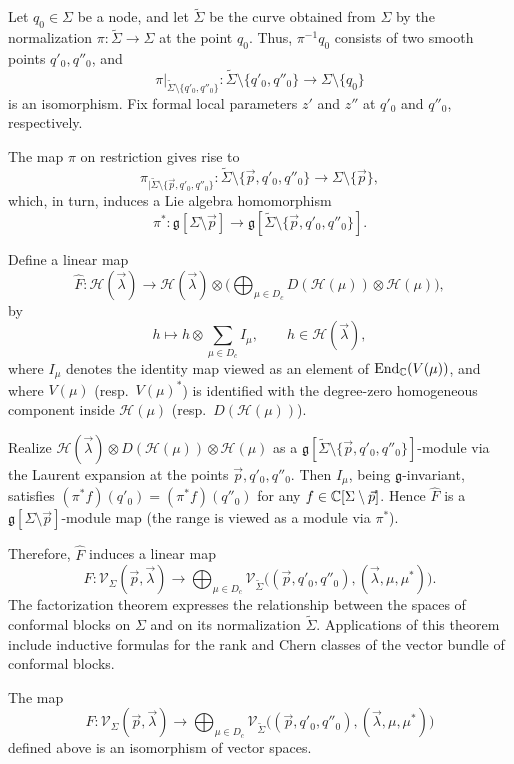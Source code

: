 \documentclass[12pt]{article}
\begin{document}
Let $q_0\in\Sigma$ be a node, and let $\widetilde\Sigma$ be the curve obtained from $\Sigma$ by the normalization $\pi:\widetilde\Sigma\to\Sigma$ at the point $q_0$. Thus, $\pi^{-1}q_0$ consists of two smooth points $q'_0,q''_0$, and
\[
  \pi|_{\widetilde\Sigma\setminus\{q'_0,q''_0\}}:\widetilde\Sigma\setminus\{q'_0,q''_0\}\longrightarrow\Sigma\setminus\{q_0\}
\]
is an isomorphism. Fix formal local parameters $z'$ and $z''$ at $q'_0$ and $q''_0$, respectively.

The map $\pi$ on restriction gives rise to
\[
  \pi_{|\widetilde\Sigma\setminus\{\vec p,q'_0,q''_0\}}:\widetilde\Sigma\setminus\{\vec p,q'_0,q''_0\}\longrightarrow\Sigma\setminus\{\vec p\},
\]
which, in turn, induces a Lie algebra homomorphism
\[
  \pi^*:\mathfrak g[\Sigma\setminus\vec p]\longrightarrow\mathfrak g[\widetilde\Sigma\setminus\{\vec p,q'_0,q''_0\}].
\]

Define a linear map
\[
  \widehat F: \mathcal H(\vec\lambda) \longrightarrow \mathcal H(\vec\lambda) \otimes \biggl( \bigoplus_{\mu\in D_c} D(\mathcal H(\mu)) \otimes \mathcal H(\mu) \biggr),
\]
by
\[
  h \longmapsto h \otimes \sum_{\mu\in D_c} I_\mu, \qquad h\in\mathcal H(\vec\lambda),
\]
where $I_\mu$ denotes the identity map viewed as an element of $\operatorname{End}_{\mathbb{C}}(V(\mu))$, and where $V(\mu)$ (resp.~$V(\mu)^*$) is identified with the degree-zero homogeneous component inside $\mathcal H(\mu)$ (resp.~$D(\mathcal H(\mu))$).

Realize $\mathcal H(\vec\lambda)\otimes D(\mathcal H(\mu))\otimes\mathcal H(\mu)$ as a $\mathfrak g[\widetilde\Sigma\setminus\{\vec p,q'_0,q''_0\}]$-module via the Laurent expansion at the points $\vec p, q'_0, q''_0$. Then $I_\mu$, being $\mathfrak g$-invariant, satisfies $(\pi^*f)(q'_0)=(\pi^*f)(q''_0)$ for any $f\in\mathbb{C}[\Sigma\setminus\vec p]$. Hence $\widehat F$ is a $\mathfrak g[\Sigma\setminus\vec p]$-module map (the range is viewed as a module via $\pi^*$).

Therefore, $\widehat F$ induces a linear map
\[
  F: \mathcal V_\Sigma(\vec p,\vec\lambda) \longrightarrow \bigoplus_{\mu\in D_c}\mathcal V_{\widetilde\Sigma}\big((\vec p,q'_0,q''_0), (\vec\lambda,\mu,\mu^*)\big).
\]
The factorization theorem expresses the relationship between the spaces of conformal blocks on $\Sigma$ and on its normalization $\widetilde\Sigma$. Applications of this theorem include inductive formulas for the rank and Chern classes of the vector bundle of conformal blocks.
\begin{theorem}
    The map \[F: \mathcal V_\Sigma(\vec p,\vec\lambda) \to \bigoplus_{\mu\in D_c}\mathcal V_{\widetilde\Sigma}\big((\vec p,q'_0,q''_0), (\vec\lambda,\mu,\mu^*)\big)\] defined above is an isomorphism of vector spaces.
\end{theorem}
\end{document}
